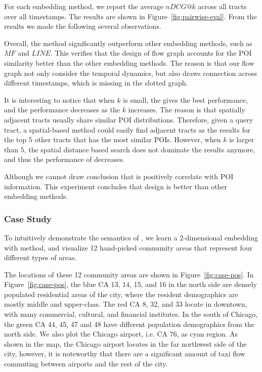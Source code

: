 For each embedding method, we report the average $nDCG@k$ across all tracts over all timestamps. The results are shown in Figure~\ref{fig:pairwise-eval}. From the results we made the following several observations.

Overall, the \hdge method significantly outperform other embedding methods, such as $MF$ and $LINE$. This verifies that the design of flow graph accounts for the POI similarity better than the other embedding methods. The reason is that our flow graph not only consider the temporal dynamics, but also draws connection across different timestamps, which is missing in the slotted graph.




It is interesting to notice that when $k$ is small, the \dges gives the best performance, and the performance decreases as the $k$ increases. The reason is that spatially adjacent tracts usually share similar POI distributions. Therefore, given a query tract, a spatial-based method could easily find adjacent tracts as the results for the top $5$ other tracts that has the most similar POIs. However, when $k$ is larger than $5$, the spatial distance based search does not dominate the results anymore, and thus the performance of \dges decreases.


Although we cannot draw conclusion that \hdge is positively correlate with POI information. This experiment concludes that \hdge design is better than other embedding methods.








\subsubsection{Case Study}


To intuitively demonstrate the semantics of \hdge, we learn a 2-dimensional embedding with \hdge method, and visualize 12 hand-picked community areas that represent four different types of areas.

The locations of these 12 community areas are shown in Figure~\ref{fig:case-pos}. In Figure~\ref{fig:case-pos}, the blue CA 13, 14, 15, and 16 in the north side are densely populated residential areas of the city, where the resident demographics are mostly middle and upper-class. The red CA 8, 32, and 33 locate in downtown, with many commercial, cultural, and financial institutes. In the south of Chicago, the green CA 44, 45, 47 and 48 have different population demographics from the north side. We also plot the Chicago airport, i.e. CA 76, as cyan region. As shown in the map, the Chicago airport locates in the far northwest side of the city, however, it is noteworthy that there are a significant amount of taxi flow commuting between airports and the rest of the city.


